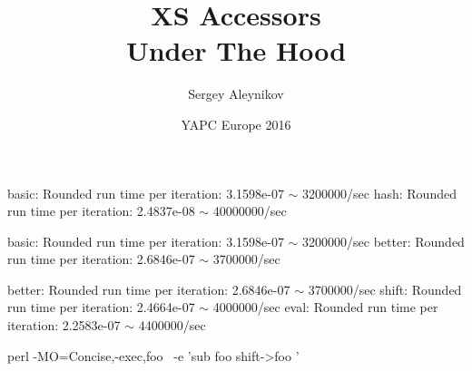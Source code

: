 \documentclass[mathserif,hyperref={urlcolor=cyan,colorlinks=true}]{beamer}
\title{XS Accessors\\Under The Hood}
\author{Sergey Aleynikov}
\date[August 2016]{YAPC Europe 2016}
\begin{document}
{

\begin{frame}
\titlepage
\end{frame}

{
\color{white}

\begin{frame}[fragile]
\pause
basic: Rounded run time per iteration: 3.1598e-07 $\sim$ 3200000/sec
hash: Rounded run time per iteration: 2.4837e-08 $\sim$ 40000000/sec
\end{frame}

\begin{frame}[fragile]
\pause
basic: Rounded run time per iteration: 3.1598e-07 $\sim$ 3200000/sec
better: Rounded run time per iteration: 2.6846e-07 $\sim$ 3700000/sec
\end{frame}

\begin{frame}[fragile]
\pause
better: Rounded run time per iteration: 2.6846e-07 $\sim$ 3700000/sec
shift: Rounded run time per iteration: 2.4664e-07 $\sim$ 4000000/sec
eval: Rounded run time per iteration: 2.2583e-07 $\sim$ 4400000/sec
\end{frame}

\begin{frame}[fragile]
\begin{multicols}{2}
\begin{bashcode}
perl -MO=Concise,-exec,foo \
 -e 'sub foo{ shift->{foo} }'


\end{bashcode}
\end{multicols}
\end{frame}}}
\end{document}
